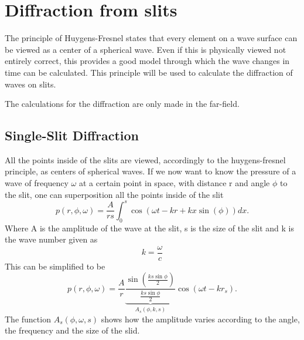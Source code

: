\section{Diffraction from slits}
The principle of Huygens-Fresnel \cite{physik_skript} states that every element on a wave surface can be viewed as a center of a spherical wave. Even if this is physically viewed not entirely correct, this provides a good model through which the wave changes in time can be calculated. This principle will be used to calculate the diffraction of waves on slits.

The calculations for the diffraction are only made in the far-field. 
\subsection{Single-Slit Diffraction}\label{2_subsec:single_slit}
All the points inside of the slits are viewed, accordingly to the huygens-fresnel principle, as centers of spherical waves. 
If we now want to know the pressure of a wave of frequency $\omega$ at a certain point in space, with distance r and angle $\phi$ to the slit, one can superposition all the points inside of the slit \cite{physik_skript}
\begin{equation}
    p(r, \phi, \omega)  
    = 
    \frac{A}{rs}\int_0^s \cos \left ( \omega t - k r + k x \sin\left ( \phi\right )\right) dx.
\end{equation}
Where A is the amplitude of the wave at the slit, s is the size of the slit and k is the wave number given as
\begin{equation}
    k 
    = 
    \frac{\omega}{c}
\end{equation}
This can be simplified to be
\begin{equation}
     p(r, \phi, \omega) 
     = 
     \frac{A}{r}  \underbrace{\frac{\sin \left ( \frac{ks \sin \phi}{2}\right )}{ \frac{ks \sin \phi}{2}}}_{A_s(\phi,k,s)} \cos \left ( \omega t - k r_s\right ).
     \label{2_eq:single_slid_final}
\end{equation}
The function $A_s(\phi,\omega,s)$ shows how the amplitude varies according to the angle, the frequency and the size of the slid. 

